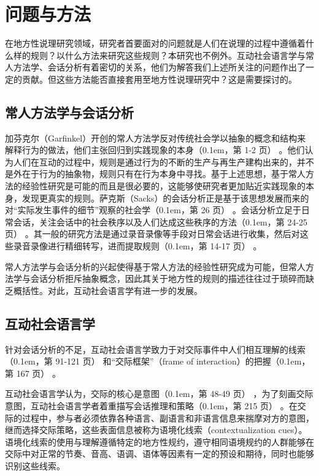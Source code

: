 \documentclass[b5paper,10.5pt,onecolumn,twoside,leqno,UTF8]{article}
\newcommand{\pcr}[1]{\raise0.1em\hbox{\parencite{#1}}}
\newcommand{\pc}[2]{（\pcr{#1}，第 #2 页）}
\begin{document}
\section{问题与方法}

在地方性说理研究领域，研究者首要面对的问题就是人们在说理的过程中遵循着什么样的规则？以什么方法来研究这些规则？本研究也不例外。互动社会语言学与常人方法学、会话分析有着密切的关系，他们为解答我们上述所关注的问题作出了一定的贡献。但这些方法能否直接套用至地方性说理研究中？这是需要探讨的。

\subsection{常人方法学与会话分析}

加芬克尔（Garfinkel）开创的常人方法学反对传统社会学以抽象的概念和结构来解释行为的做法，他们主张回归到实践现象的本身\pc{Garfinkel2002}{1-2} 。他们认为人们在互动的过程中，规则是通过行为的不断的生产与再生产建构出来的，并不是外在于行为的抽象物，规则只有在行为本身中寻找。基于上述思想，基于常人方法的经验性研究是可能的而且是很必要的，这能够使研究者更加贴近实践现象的本身，发现更真实的规则。萨克斯（Sacks）的会话分析正是基于该思想发展而来的对“实际发生事件的细节”观察的社会学\pc{Sacks}{26} 。会话分析立足于日常会话，关注会话中的社会秩序以及人们达成这些秩序的方法\pc{Michael Lynch1993}{24-25} 。其一般的研究方法是通过录音录像等手段对日常会话进行收集，然后对这些录音录像进行精细转写，进而提取规则\pc{于国栋 and 李枫2009}{14-17} 。

常人方法学与会话分析的兴起使得基于常人方法的经验性研究成为可能，但常人方法学与会话分析拒斥抽象概念，因此其关于地方性的规则的描述往往过于琐碎而缺乏概括性。对此，互动社会语言学有进一步的发展。

\subsection{互动社会语言学}

针对会话分析的不足，互动社会语言学致力于对交际事件中人们相互理解的线索\pc{Gumperz, J.J. & N. Berenz.1993}{91-121} 和“交际框架”（frame of interaction）的把握\pc{Gumperz, J.J.1982}{167} 。

互动社会语言学认为，交际的核心是意图\pc{郑立华2012}{48-49} ，为了刻画交际意图，互动社会语言学者着重描写会话推理和策略\pc{Gumperz, J.J.2001}{215} 。在交际的过程中，参与者必须依靠各种语言、副语言和非语言信息来揣摩对方的意图，继而选择交际策略，这些表面信息被称为语境化线索（contextualization cues）。语境化线索的使用与理解遵循特定的地方性规约，遵守相同语境规约的人群能够在交际中对正常的节奏、音高、语调、语体等因素有一定的预设和期待，同时也能够识别这些线索。
\end{document}
